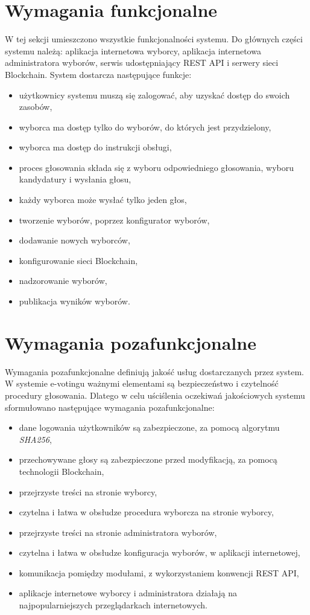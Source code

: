 \documentclass[a4paper,12pt]{book}
\begin{document}
\section {Wymagania funkcjonalne}

W tej sekcji umieszczono wszystkie funkcjonalności systemu. Do głównych części systemu należą: aplikacja internetowa wyborcy, aplikacja internetowa administratora wyborów, serwis udostępniający REST API i serwery sieci Blockchain. System dostarcza następujące funkcje:

\begin{itemize}
	\item użytkownicy systemu muszą się zalogować, aby uzyskać dostęp do swoich zasobów,
	\item wyborca ma dostęp tylko do wyborów, do których jest przydzielony,
	\item wyborca ma dostęp do instrukcji obsługi,
	\item proces głosowania składa się z wyboru odpowiedniego głosowania, wyboru kandydatury i wysłania głosu,
	\item każdy wyborca może wysłać tylko jeden głos,
	\item tworzenie wyborów, poprzez konfigurator wyborów,
	\item dodawanie nowych wyborców,
	\item konfigurowanie sieci Blockchain,
	\item nadzorowanie wyborów,
	\item publikacja wyników wyborów.
\end{itemize}

\section {Wymagania pozafunkcjonalne}

Wymagania pozafunkcjonalne definiują jakość usług dostarczanych przez system. W systemie e-votingu ważnymi elementami są bezpieczeństwo i czytelność procedury głosowania. Dlatego w celu uściślenia oczekiwań jakościowych systemu sformułowano następujące wymagania pozafunkcjonalne:

\begin{itemize}
	\item dane logowania użytkowników są zabezpieczone, za pomocą algorytmu \textit{SHA256},
	\item przechowywane głosy są zabezpieczone przed modyfikacją, za pomocą technologii Blockchain,
	\item przejrzyste treści na stronie wyborcy,
	\item czytelna i łatwa w obsłudze procedura wyborcza na stronie wyborcy,
	\item przejrzyste treści na stronie administratora wyborów,
	\item czytelna i łatwa w obsłudze konfiguracja wyborów, w aplikacji internetowej,
	\item komunikacja pomiędzy modułami, z wykorzystaniem konwencji REST API,
	\item aplikacje internetowe wyborcy i administratora działają na najpopularniejszych przeglądarkach internetowych.
\end{itemize}
\end{document}
